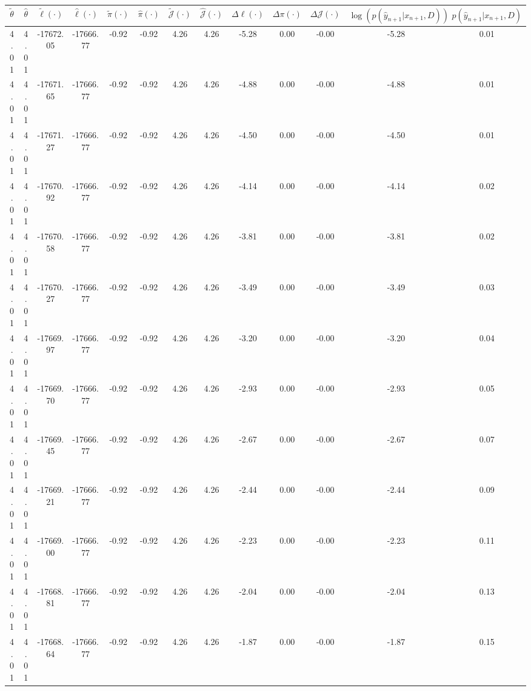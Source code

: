 \begin{table}[htbp]
        \centering
        \tiny
        \begin{adjustbox}{angle=90}
            \begin{tabular}{|c|c|c|c|c|c|c|c|c|c|c|c|c|}
                \hline
                 $\tilde{\theta}$ & $\hat{\theta}$ & $\tilde{\ell}(\cdot)$ & $\hat{\ell}(\cdot)$ & $\tilde{\pi}(\cdot)$ & $\hat{\pi}(\cdot)$ & $\tilde{\mathcal{J}}(\cdot)$ & $\hat{\mathcal{J}}(\cdot)$ & $\Delta \ell(\cdot)$ & $\Delta \pi(\cdot)$ & $\Delta \mathcal{J}(\cdot)$ & $\log(p(\hat{y}_{n+1}|x_{n+1}, D))$ & $p(\hat{y}_{n+1}|x_{n+1}, D)$ \\
                \hline
                 4.01 & 4.01 & -17672.05 & -17666.77 & -0.92 & -0.92 & 4.26 & 4.26 & -5.28 & 0.00 & -0.00 & -5.28 & 0.01\\ \hline
 4.01 & 4.01 & -17671.65 & -17666.77 & -0.92 & -0.92 & 4.26 & 4.26 & -4.88 & 0.00 & -0.00 & -4.88 & 0.01\\ \hline
 4.01 & 4.01 & -17671.27 & -17666.77 & -0.92 & -0.92 & 4.26 & 4.26 & -4.50 & 0.00 & -0.00 & -4.50 & 0.01\\ \hline
 4.01 & 4.01 & -17670.92 & -17666.77 & -0.92 & -0.92 & 4.26 & 4.26 & -4.14 & 0.00 & -0.00 & -4.14 & 0.02\\ \hline
 4.01 & 4.01 & -17670.58 & -17666.77 & -0.92 & -0.92 & 4.26 & 4.26 & -3.81 & 0.00 & -0.00 & -3.81 & 0.02\\ \hline
 4.01 & 4.01 & -17670.27 & -17666.77 & -0.92 & -0.92 & 4.26 & 4.26 & -3.49 & 0.00 & -0.00 & -3.49 & 0.03\\ \hline
 4.01 & 4.01 & -17669.97 & -17666.77 & -0.92 & -0.92 & 4.26 & 4.26 & -3.20 & 0.00 & -0.00 & -3.20 & 0.04\\ \hline
 4.01 & 4.01 & -17669.70 & -17666.77 & -0.92 & -0.92 & 4.26 & 4.26 & -2.93 & 0.00 & -0.00 & -2.93 & 0.05\\ \hline
 4.01 & 4.01 & -17669.45 & -17666.77 & -0.92 & -0.92 & 4.26 & 4.26 & -2.67 & 0.00 & -0.00 & -2.67 & 0.07\\ \hline
 4.01 & 4.01 & -17669.21 & -17666.77 & -0.92 & -0.92 & 4.26 & 4.26 & -2.44 & 0.00 & -0.00 & -2.44 & 0.09\\ \hline
 4.01 & 4.01 & -17669.00 & -17666.77 & -0.92 & -0.92 & 4.26 & 4.26 & -2.23 & 0.00 & -0.00 & -2.23 & 0.11\\ \hline
 4.01 & 4.01 & -17668.81 & -17666.77 & -0.92 & -0.92 & 4.26 & 4.26 & -2.04 & 0.00 & -0.00 & -2.04 & 0.13\\ \hline
 4.01 & 4.01 & -17668.64 & -17666.77 & -0.92 & -0.92 & 4.26 & 4.26 & -1.87 & 0.00 & -0.00 & -1.87 & 0.15\\ \hline

\end{tabular}
\end{adjustbox}
\end{table}
